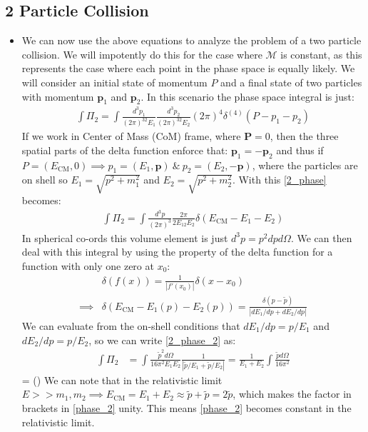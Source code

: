 \documentclass[11pt]{article}
\numberwithin{equation}{section}
\renewenvironment{flalign}{\vspace{-3mm}\empheq[box=\tcbhighmath]{align}}{\endempheq}
\begin{document}
 \subsection{2 Particle Collision} %
 \label{sub:2_particle_collision}
 \begin{itemize}
     \item We can now use the above equations to analyze the problem of a two particle collision. We will impotently do this for the case where $\mathcal{M}$ is constant, as this represents the case where each point in the phase space is equally likely. We will consider an initial state of momentum $P$ and a final state of two particles with momentum $\textbf{p}_1$ and $\textbf{p}_2$. In this scenario the phase space integral is just:
     \begin{align}
     \label{2_phase}
         \int \Pi_2 = \int \frac{d^3p_1}{(2\pi)^32E_1}\frac{d^3p_2}{(2\pi)^32E_2}(2\pi)^4\delta^{(4)}(P-p_1-p_2)
     \end{align}
 If we work in Center of Mass (CoM) frame, where $\textbf{P}=0$, then the three spatial parts of the delta function enforce that: $\textbf{p}_1=-\textbf{p}_2$ and thus if $P = (E_{\text{CM}},0) \implies p_1=(E_1,\textbf{p}) ~\&~ p_2=(E_2,-\textbf{p})$, where the particles are on shell so $E_1 = \sqrt{p^2+m_1^2}$ and $E_2 = \sqrt{p^2+m_2^2}$. With this \ref{2_phase} becomes:
     \begin{align}
     \label{2_phase_2}
         \int \Pi_2 = \int \frac{d^3p}{(2\pi)^3}\frac{2\pi}{2E_12E_2}\delta(E_{\text{CM}}-E_1-E_2)
     \end{align}
     In spherical co-ords this volume element is just $d^3p=p^2dpd\Omega$. We can then deal with this integral by using the property of the delta function for a function with only one zero at $x_0$:
     \begin{align*}
         &\delta(f(x)) = \frac{1}{|f'(x_0)|}\delta(x-x_0) \\
         \implies  & \delta(E_{\text{CM}}-E_1(p)-E_2(p)) = \frac{\delta(p-\tilde{p})}{|dE_1/dp+dE_2/dp|}
     \end{align*}
         We can evaluate from the on-shell conditions that $dE_1/dp = p/E_1$ and $dE_2/dp = p/E_2$, so we can write \ref{2_phase_2} as:
     \begin{align*}
          \int \Pi_2 &= \int \frac{\tilde{p}^2d\Omega}{16\pi^2E_1E_2}\frac{1}{|\tilde{p}/E_1+\tilde{p}/E_2|} = \frac{1}{E_1+E_2}\int \frac{\tilde{p}d\Omega }{16\pi^2} 
     \end{align*}
     \begin{flalign}
     \label{phase_2}
         = \left(\right)\int{} 
     \end{flalign}
     We can note that in the relativistic limit $E>>m_1,m_2 \implies E_{\text{CM}} = E_1+E_2 \approx \tilde{p}+\tilde{p} =2\tilde{p}$, which makes the factor in brackets in \ref{phase_2} unity. This means \ref{phase_2} becomes constant in the relativistic limit. 
 \end{itemize}
\end{document}

